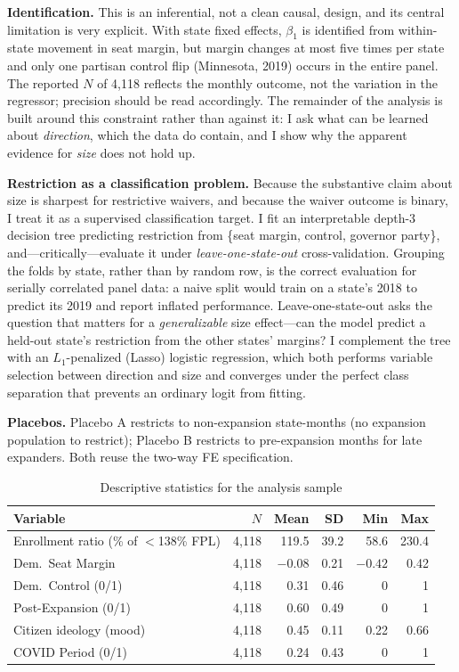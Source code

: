 \documentclass[9pt,twoside]{pnas-new}
\begin{document}
\textbf{Identification.} This is an inferential, not a clean causal, design, and its central limitation is very explicit. With state fixed effects, $\beta_1$ is identified from within-state movement in seat margin, but margin changes at most five times per state and only one partisan control flip (Minnesota, 2019) occurs in the entire panel. The reported $N$ of 4{,}118 reflects the monthly outcome, not the variation in the regressor; precision should be read accordingly. The remainder of the analysis is built around this constraint rather than against it: I ask what can be learned about \emph{direction}, which the data do contain, and I show why the apparent evidence for \emph{size} does not hold up.

\textbf{Restriction as a classification problem.} Because the substantive claim about size is sharpest for restrictive waivers, and because the waiver outcome is binary, I treat it as a supervised classification target. I fit an interpretable depth-3 decision tree predicting restriction from \{seat margin, control, governor party\}, and---critically---evaluate it under \emph{leave-one-state-out} cross-validation. Grouping the folds by state, rather than by random row, is the correct evaluation for serially correlated panel data: a naive split would train on a state's 2018 to predict its 2019 and report inflated performance. Leave-one-state-out asks the question that matters for a \emph{generalizable} size effect---can the model predict a held-out state's restriction from the other states' margins? I complement the tree with an $L_1$-penalized (Lasso) logistic regression, which both performs variable selection between direction and size and converges under the perfect class separation that prevents an ordinary logit from fitting.

\textbf{Placebos.} Placebo A restricts to non-expansion state-months (no expansion population to restrict); Placebo B restricts to pre-expansion months for late expanders. Both reuse the two-way FE specification.

\begin{table}[htbp]
\centering
\caption{Descriptive statistics for the analysis sample}
\label{tab:desc}
\small
\begin{tabular}{lrrrrr}
\toprule
Variable & $N$ & Mean & SD & Min & Max\\
\midrule
Enrollment ratio (\% of $<$138\% FPL) & 4{,}118 & 119.5 & 39.2 & 58.6 & 230.4\\
Dem.\ Seat Margin & 4{,}118 & $-0.08$ & 0.21 & $-0.42$ & 0.42\\
Dem.\ Control (0/1) & 4{,}118 & 0.31 & 0.46 & 0 & 1\\
Post-Expansion (0/1) & 4{,}118 & 0.60 & 0.49 & 0 & 1\\
Citizen ideology (mood) & 4{,}118 & 0.45 & 0.11 & 0.22 & 0.66\\
COVID Period (0/1) & 4{,}118 & 0.24 & 0.43 & 0 & 1\\
\bottomrule
\end{tabular}
\end{table}
\end{document}
